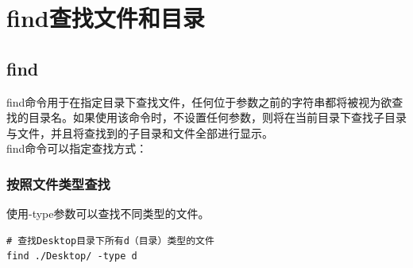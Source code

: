 \documentclass[12pt, openany, oneside]{book}
\begin{document}
\newpage

\section{find查找文件和目录}

\subsection{find}

find命令用于在指定目录下查找文件，任何位于参数之前的字符串都将被视为欲查找的目录名。如果使用该命令时，不设置任何参数，则将在当前目录下查找子目录与文件，并且将查找到的子目录和文件全部进行显示。\\

find命令可以指定查找方式：

\subsubsection{按照文件类型查找}

使用-type参数可以查找不同类型的文件。

\vspace{-0.5cm}

\begin{lstlisting}
# 查找Desktop目录下所有d（目录）类型的文件
find ./Desktop/ -type d
\end{lstlisting}

\begin{table}[H]
    \centering
    \caption{文件类型}
\end{table}
\end{document}
